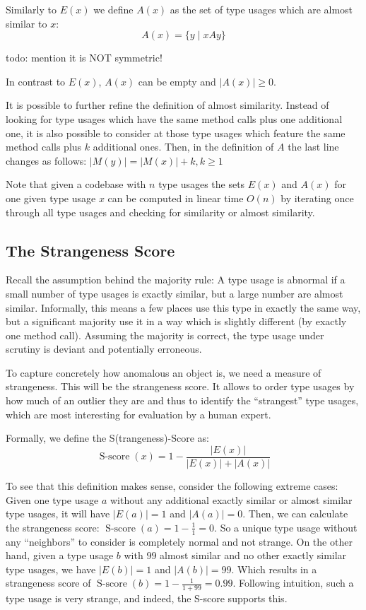 Similarly to $E(x)$ we define $A(x)$ as the set of type usages which are almost similar to $x$:
\begin{equation*}
A(x) = \{y \mid xAy \}
\end{equation*}

todo: mention it is NOT symmetric!

In contrast to $E(x)$, $A(x)$ can be empty and $|A(x)|\geq0$.

It is possible to further refine the definition of almost similarity.
Instead of looking for type usages which have the same method calls plus one additional one, it is also possible to consider at those type usages which feature the same method calls plus $k$ additional ones.
Then, in the definition of $A$ the last line changes as follows: $|M(y)| = |M(x)| + k, k\geq1$

Note that given a codebase with $n$ type usages the sets $E(x)$ and $A(x)$ for one given type usage $x$ can be computed in linear time $O(n)$ by iterating once through all type usages and checking for similarity or almost similarity.

\subsection{The Strangeness Score}

Recall the assumption behind the majority rule: A type usage is abnormal if a small number of type usages is exactly similar, but a large number are almost similar.
Informally, this means a few places use this type in exactly the same way, but a significant majority use it in a way which is slightly different (by exactly one method call).
Assuming the majority is correct, the type usage under scrutiny is deviant and potentially erroneous.

To capture concretely how anomalous an object is, we need a measure of strangeness.
This will be the strangeness score.
It allows to order type usages by how much of an outlier they are and thus to identify the ``strangest'' type usages, which are most interesting for evaluation by a human expert.

Formally, we define the S(trangeness)-Score as:
\begin{equation*}
    \operatorname{S-score}(x) = 1 - \frac{|E(x)|}{|E(x)|+|A(x)|}
\end{equation*}

To see that this definition makes sense, consider the following extreme cases:
Given one type usage $a$ without any additional exactly similar or almost similar type usages, it will have $|E(a)| = 1$ and $|A(a)| = 0$.
Then, we can calculate the strangeness score: $\operatorname{S-score}(a) = 1-\frac{1}{1} = 0$.
So a unique type usage without any ``neighbors'' to consider is completely normal and not strange.
On the other hand, given a type usage $b$ with $99$ almost similar and no other exactly similar type usages, we have $|E(b)| = 1$ and $|A(b)| = 99$.
Which results in a strangeness score of $\operatorname{S-score}(b) = 1-\frac{1}{1+99} = 0.99$.
Following intuition, such a type usage is very strange, and indeed, the S-score supports this.

